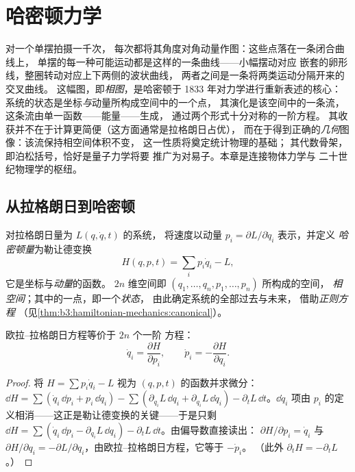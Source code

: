 \chapter{哈密顿力学}\label{ch:b3:hamiltonian-mechanics}

对一个单摆拍摄一千次，
每次都将其角度对角动量作图：这些点落在一条闭合曲线上，
单摆的每一种可能运动都是这样的一条曲线——小幅摆动对应
嵌套的卵形线，整圈转动对应上下两侧的波状曲线，
两者之间是一条将两类运动分隔开来的交叉曲线。
这幅图，即\emph{相图}，是哈密顿于 1833 年对力学进行重新表述的核心：
系统的状态是坐标\emph{与}动量所构成空间中的一个点，
其演化是该空间中的一条流，
这条流由单一函数——能量——生成，
通过两个形式十分对称的一阶方程。
其收获并不在于计算更简便（这方面通常是拉格朗日占优），
而在于得到正确的\emph{几何}图像：该流保持相空间体积不变，
这一性质将奠定统计物理的基础；
其代数骨架，即泊松括号，恰好是量子力学将要
推广为对易子。本章是连接物体力学与
二十世纪物理学的枢纽。

\section{从拉格朗日到哈密顿}

\begin{definition}[哈密顿量与正则方程]\label{def:b3:hamiltonian-mechanics:hamiltonian}
对拉格朗日量为 $L(q, \dot q, t)$ 的系统，
将速度以动量 $p_i = \partial L/\partial\dot q_i$ 表示，并定义
\emph{哈密顿量}为勒让德变换
\[
H(q, p, t) = \sum_i p_i\dot q_i - L ,
\]
它是坐标与\emph{动量}的函数。
$2n$ 维空间即 $(q_1, \dots, q_n, p_1, \dots, p_n)$ 所构成的空间，
\emph{相空间}；其中的一点，即一个\emph{状态}，
由此确定系统的全部过去与未来，
借助\emph{正则方程}
（见\cref{thm:b3:hamiltonian-mechanics:canonical}）。
\end{definition}

\begin{theorem}[正则方程]\label{thm:b3:hamiltonian-mechanics:canonical}
欧拉–拉格朗日方程等价于 $2n$ 个一阶
方程：
\[
\dot q_i = \frac{\partial H}{\partial p_i} , \qquad
\dot p_i = -\frac{\partial H}{\partial q_i} .
\]
\end{theorem}

\begin{proof}
将 $H = \sum p_i\dot q_i - L$ 视为 $(q, p, t)$ 的函数并求微分：
$\dd H = \sum(\dot q_i\,\dd p_i + p_i\,\dd\dot q_i) - \sum(
\partial_{q_i}L\,\dd q_i + \partial_{\dot q_i}L\,\dd\dot q_i) -
\partial_tL\,\dd t$。$\dd\dot q_i$ 项由
$p_i$ 的定义相消——这正是勒让德变换的关键——于是只剩
$\dd H = \sum(\dot q_i\,\dd p_i - \partial_{q_i}L\,\dd q_i) -
\partial_tL\,\dd t$。由偏导数直接读出：
$\partial H/\partial p_i = \dot q_i$ 与 $\partial H/\partial q_i =
-\partial L/\partial q_i$，由欧拉–拉格朗日方程，它等于 $-\dot p_i$。
（此外 $\partial_tH = -\partial_tL$。）
\end{proof}

